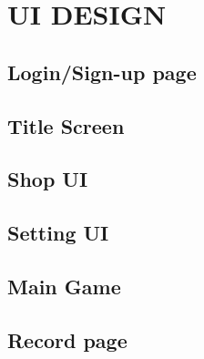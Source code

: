 \documentclass[11pt]{article}
\begin{document}
\section{UI DESIGN}

\subsection{Login/Sign-up page}

\subsection{Title Screen}

\subsection{Shop UI}

\subsection{Setting UI}

\subsection{Main Game}

\subsection{Record page}
\end{document}
